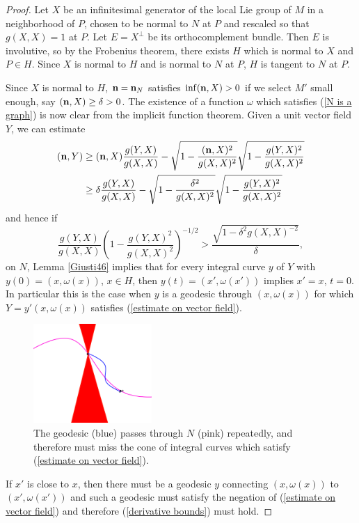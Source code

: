 \begin{proof}
Let $X$ be an infinitesimal generator of the local Lie group of $M$ in a neighborhood of $P$, chosen to be normal to $N$ at $P$ and rescaled so that $g(X, X) = 1$ at $P$.
Let $E = X^\perp$ be its orthocomplement bundle. Then $E$ is involutive, so by the Frobenius theorem, there exists $H$ which is normal to $X$ and $P \in H$.
Since $X$ is normal to $H$ and is normal to $N$ at $P$, $H$ is tangent to $N$ at $P$.

Since $X$ is normal to $H$, $\mathbf n = \mathbf n_N$ satisfies $\inf (\mathbf n, X) > 0$ if we select $M'$ small enough, say $(\mathbf n, X) \geq \delta > 0$.
The existence of a function $\omega$ which satisfies (\ref{N is a graph}) is now clear from the implicit function theorem.
Given a unit vector field $Y$, we can estimate
\begin{align*}
(\mathbf n, Y)
&\geq (\mathbf n, X) \frac{g(Y, X)}{g(X, X)} - \sqrt{1 - \frac{(\mathbf n, X)^2}{g(X, X)^2}}\sqrt{1 - \frac{g(Y, X)^2}{g(X, X)^2}}\\
&\geq \delta \frac{g(Y, X)}{g(X, X)} - \sqrt{1 - \frac{\delta^2}{g(X, X)^2}} \sqrt{1 - \frac{g(Y, X)^2}{g(X, X)^2}}
\end{align*}
and hence if
\begin{equation}\label{estimate on vector field}
\frac{g(Y, X)}{g(X, X)} \left(1 - \frac{g(Y, X)^2}{g(X, X)^2}\right)^{-1/2} > \frac{\sqrt{1 - \delta^2 g(X, X)^{-2}}}{\delta},
\end{equation}
on $N$, Lemma \ref{Giusti46} implies that for every integral curve $y$ of $Y$ with $y(0) = (x, \omega(x))$, $x \in H$, then $y(t) = (x', \omega(x'))$ implies $x' = x$, $t = 0$.
In particular this is the case when $y$ is a geodesic through $(x, \omega(x))$ for which $Y = y'(x, \omega(x))$ satisfies (\ref{estimate on vector field}).

\begin{figure}[ht]
\caption{The geodesic (blue) passes through $N$ (pink) repeatedly, and therefore must miss the cone of integral curves which satisfy (\ref{estimate on vector field}).}
\includegraphics[width=0.4\textwidth]{graph_cone}
\end{figure}

If $x'$ is close to $x$, then there must be a geodesic $y$ connecting $(x, \omega(x))$ to $(x', \omega(x'))$ and such a geodesic must satisfy the negation of (\ref{estimate on vector field})
and therefore (\ref{derivative bounds}) must hold.
\end{proof}

